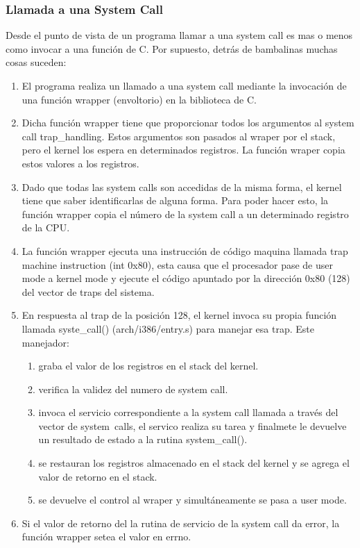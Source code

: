 \documentclass[../main.tex]{subfiles}
\begin{document}
        \subsubsection*{Llamada a una System Call}
            Desde el punto de vista de un programa llamar a una system call es mas o menos como invocar a una función de C. Por supuesto, detrás de bambalinas muchas cosas suceden:

            \begin{enumerate}
                \item El programa realiza un llamado a una system call mediante la invocación de una función wrapper (envoltorio) en la biblioteca de C.
                \item Dicha función wrapper tiene que proporcionar todos los argumentos al system call trap\_handling. Estos argumentos son pasados al wraper por el stack, pero el kernel los espera en determinados registros. La función wraper copia estos valores a los registros.
                \item Dado que todas las system calls son accedidas de la misma forma, el kernel tiene que saber identificarlas de alguna forma. Para poder hacer esto, la función wrapper copia el número de la system call a un determinado registro de la CPU. 
                \item La función wrapper ejecuta una instrucción de código maquina llamada trap machine instruction (int 0x80), esta causa que el procesador pase de user mode a kernel mode y ejecute el código apuntado por la dirección 0x80 (128) del vector de traps del sistema.
                \item En respuesta al trap de la posición 128, el kernel invoca su propia función llamada syste\_call() (arch/i386/entry.s) para manejar esa trap. Este manejador:
                      \begin{enumerate}
                        \item graba el valor de los registros en el stack del kernel.
                        \item verifica la validez del numero de system call.
                        \item invoca el servicio correspondiente a la system call llamada a través del vector de system\ calls, el servico realiza su tarea y finalmete le devuelve un resultado de estado a la rutina system\_call().
                        \item se restauran los registros almacenado en el stack del kernel y se agrega el valor de retorno en el stack.
                        \item se devuelve el control al wraper y simultáneamente se pasa a user mode.
                      \end{enumerate}
                \item Si el valor de retorno del la rutina de servicio de la system call da error, la función wrapper setea el valor en errno.
            \end{enumerate}
\end{document}
